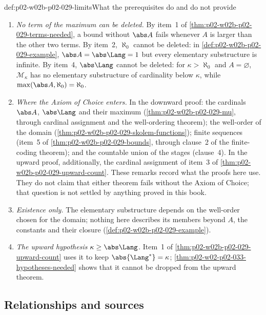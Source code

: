 \begin{hbwarning}{def:p02-w02b-p02-029-limits}{What the prerequisites do and do not provide}
\begin{enumerate}
  \item \emph{No term of the maximum can be deleted.} By item~1 of
        \cref{thm:p02-w02b-p02-029-terms-needed}, a bound without \(\abs A\)
        fails whenever \(A\) is larger than the other two terms. By item~2,
        \(\aleph_0\) cannot be deleted: in
        \cref{def:p02-w02b-p02-029-example}, \(\abs A=\abs\Lang=1\) but every
        elementary substructure is infinite. By item~4, \(\abs\Lang\) cannot
        be deleted: for \(\kappa>\aleph_0\) and \(A=\varnothing\),
        \(\mathcal M_\kappa\) has no elementary substructure of cardinality
        below \(\kappa\), while \(\max(\abs A,\aleph_0)=\aleph_0\).
  \item \emph{Where the Axiom of Choice enters.} In the downward proof:
        the cardinals \(\abs A\), \(\abs\Lang\) and their maximum
        (\cref{thm:p02-w02b-p02-029-mu}, through cardinal assignment and the
        well-ordering theorem); the well-order of the domain
        (\cref{thm:p02-w02b-p02-029-skolem-functions}); finite sequences
        (item~5 of \cref{thm:p02-w02b-p02-029-bounds}, through clause~2 of
        the finite-coding theorem); and the countable union of the stages
        (clause~4). In the upward proof, additionally, the cardinal
        assignment of item~3 of \cref{thm:p02-w02b-p02-029-upward-count}.
        These remarks record what the proofs here use. They do not claim that
        either theorem fails without the Axiom of Choice; that question is
        not settled by anything proved in this book.
  \item \emph{Existence only.} The elementary substructure depends on the
        well-order chosen for the domain; nothing here describes its members
        beyond \(A\), the constants and their closure
        (\cref{def:p02-w02b-p02-029-example}).
  \item \emph{The upward hypothesis \(\kappa\geq\abs\Lang\).} Item~1 of
        \cref{thm:p02-w02b-p02-029-upward-count} uses it to keep
        \(\abs{\Lang^*}=\kappa\); \cref{thm:p02-w02-p02-033-hypotheses-needed}
        shows that it cannot be dropped from the upward theorem.
\end{enumerate}
\end{hbwarning}

\subsection{Relationships and sources}
\label{sec:p02-w02b-p02-029-sources}

